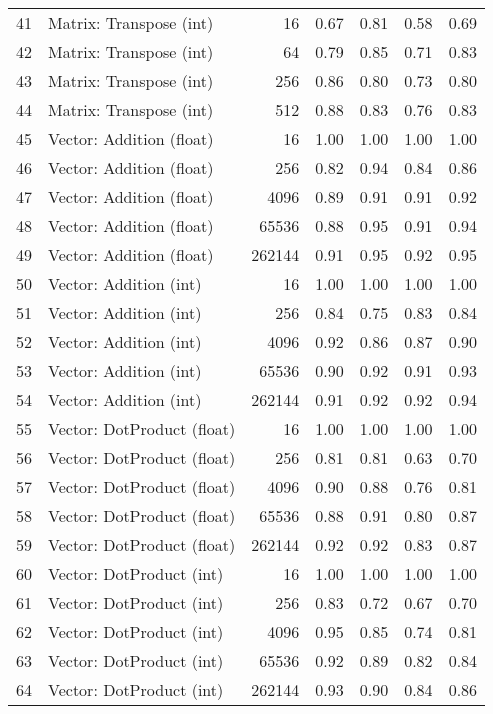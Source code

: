 \begin{tabular}{rlrrrrr}
 41 & Matrix: Transpose (int)    &     16 &   0.67 &     0.81 &   0.58 &     0.69 \\
 42 & Matrix: Transpose (int)    &     64 &   0.79 &     0.85 &   0.71 &     0.83 \\
 43 & Matrix: Transpose (int)    &    256 &   0.86 &     0.80 &   0.73 &     0.80 \\
 44 & Matrix: Transpose (int)    &    512 &   0.88 &     0.83 &   0.76 &     0.83 \\
 45 & Vector: Addition (float)   &     16 &   1.00 &     1.00 &   1.00 &     1.00 \\
 46 & Vector: Addition (float)   &    256 &   0.82 &     0.94 &   0.84 &     0.86 \\
 47 & Vector: Addition (float)   &   4096 &   0.89 &     0.91 &   0.91 &     0.92 \\
 48 & Vector: Addition (float)   &  65536 &   0.88 &     0.95 &   0.91 &     0.94 \\
 49 & Vector: Addition (float)   & 262144 &   0.91 &     0.95 &   0.92 &     0.95 \\
 50 & Vector: Addition (int)     &     16 &   1.00 &     1.00 &   1.00 &     1.00 \\
 51 & Vector: Addition (int)     &    256 &   0.84 &     0.75 &   0.83 &     0.84 \\
 52 & Vector: Addition (int)     &   4096 &   0.92 &     0.86 &   0.87 &     0.90 \\
 53 & Vector: Addition (int)     &  65536 &   0.90 &     0.92 &   0.91 &     0.93 \\
 54 & Vector: Addition (int)     & 262144 &   0.91 &     0.92 &   0.92 &     0.94 \\
 55 & Vector: DotProduct (float) &     16 &   1.00 &     1.00 &   1.00 &     1.00 \\
 56 & Vector: DotProduct (float) &    256 &   0.81 &     0.81 &   0.63 &     0.70 \\
 57 & Vector: DotProduct (float) &   4096 &   0.90 &     0.88 &   0.76 &     0.81 \\
 58 & Vector: DotProduct (float) &  65536 &   0.88 &     0.91 &   0.80 &     0.87 \\
 59 & Vector: DotProduct (float) & 262144 &   0.92 &     0.92 &   0.83 &     0.87 \\
 60 & Vector: DotProduct (int)   &     16 &   1.00 &     1.00 &   1.00 &     1.00 \\
 61 & Vector: DotProduct (int)   &    256 &   0.83 &     0.72 &   0.67 &     0.70 \\
 62 & Vector: DotProduct (int)   &   4096 &   0.95 &     0.85 &   0.74 &     0.81 \\
 63 & Vector: DotProduct (int)   &  65536 &   0.92 &     0.89 &   0.82 &     0.84 \\
 64 & Vector: DotProduct (int)   & 262144 &   0.93 &     0.90 &   0.84 &     0.86 \\
\bottomrule
\end{tabular}